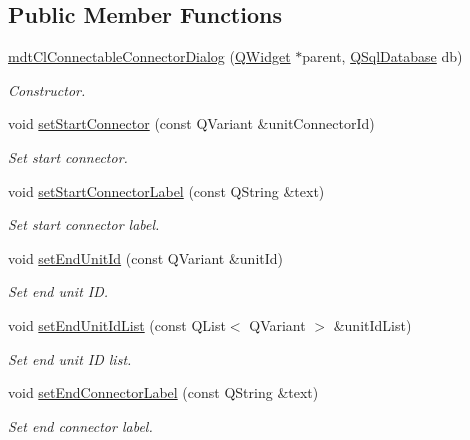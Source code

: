 \subsection*{Public Member Functions}
\begin{DoxyCompactItemize}
\item 
\hyperlink{classmdt_cl_connectable_connector_dialog_a886a38f7bb609e74f7440ccff7738774}{mdt\-Cl\-Connectable\-Connector\-Dialog} (\hyperlink{class_q_widget}{Q\-Widget} $\ast$parent, \hyperlink{class_q_sql_database}{Q\-Sql\-Database} db)
\begin{DoxyCompactList}\small\item\em Constructor. \end{DoxyCompactList}\item 
void \hyperlink{classmdt_cl_connectable_connector_dialog_a61aa76abf546dccfa16f6fc85c098d4d}{set\-Start\-Connector} (const Q\-Variant \&unit\-Connector\-Id)
\begin{DoxyCompactList}\small\item\em Set start connector. \end{DoxyCompactList}\item 
void \hyperlink{classmdt_cl_connectable_connector_dialog_ace67d831f691e17ab37bbf9bf4fa09b3}{set\-Start\-Connector\-Label} (const Q\-String \&text)
\begin{DoxyCompactList}\small\item\em Set start connector label. \end{DoxyCompactList}\item 
void \hyperlink{classmdt_cl_connectable_connector_dialog_a0f2ef9585fab080d76e300bf83a9da7e}{set\-End\-Unit\-Id} (const Q\-Variant \&unit\-Id)
\begin{DoxyCompactList}\small\item\em Set end unit I\-D. \end{DoxyCompactList}\item 
void \hyperlink{classmdt_cl_connectable_connector_dialog_a4761b9554ed57e2a11707067c9835acf}{set\-End\-Unit\-Id\-List} (const Q\-List$<$ Q\-Variant $>$ \&unit\-Id\-List)
\begin{DoxyCompactList}\small\item\em Set end unit I\-D list. \end{DoxyCompactList}\item 
void \hyperlink{classmdt_cl_connectable_connector_dialog_abeae66c11ac520d6f889ec154a4492d5}{set\-End\-Connector\-Label} (const Q\-String \&text)
\begin{DoxyCompactList}\small\item\em Set end connector label. \end{DoxyCompactList}\item 

\end{DoxyCompactItemize}

